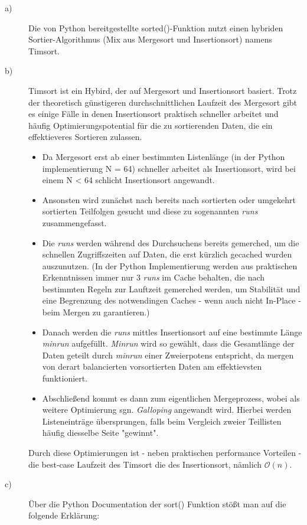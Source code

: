 \begin{description}
\item[a)] Die von Python bereitgestellte sorted()-Funktion nutzt einen hybriden Sortier-Algorithmus (Mix aus Mergesort und Insertionsort) namens Timsort.
\item[b)]
Timsort ist ein Hybird, der auf Mergesort und Insertionsort basiert. Trotz der theoretisch günstigeren durchschnittlichen Laufzeit des Mergesort gibt es einige Fälle in denen Insertionsort praktisch schneller arbeitet und häufig Optimierungspotential für die zu sortierenden Daten, die ein effektieveres Sortieren zulassen.
\begin{itemize}
\item Da Mergesort erst ab einer bestimmten Listenlänge (in der Python implementierung N = 64) schneller arbeitet als Insertionsort, wird bei einem N < 64 schlicht Insertionsort angewandt.
\item Ansonsten wird zunächst nach bereits nach sortierten oder umgekehrt sortierten Teilfolgen gesucht und diese zu sogenannten \textit{runs} zusammengefasst.
\item Die \textit{runs} werden während des Durchsuchens bereits gemerched, um die schnellen Zugriffszeiten auf Daten, die erst kürzlich gecached wurden auszunutzen. (In der Python Implementierung werden aus praktischen Erkenntnissen immer nur 3 \textit{runs} im Cache behalten, die nach bestimmten Regeln zur Lauftzeit gemerched werden, um Stabilität und eine Begrenzung des notwendingen Caches - wenn auch nicht In-Place - beim Mergen zu garantieren.)
\item Danach werden die \textit{runs} mittles Insertionsort auf eine bestimmte Länge \textit{minrun} aufgefüllt. \textit{Minrun} wird so gewählt, dass die Gesamtlänge der Daten geteilt durch \textit{minrun} einer Zweierpotens entspricht, da mergen von derart balancierten vorsortierten Daten am effektievsten funktioniert.
\item Abschließend kommt es dann zum eigentlichen Mergeprozess, wobei als weitere Optimierung sgn. \textit{Galloping} angewandt wird. Hierbei werden Listeneinträge übersprungen, falls beim Vergleich zweier Teillisten häufig diesselbe Seite "gewinnt".
\end{itemize}
Durch diese Optimierungen ist - neben praktischen performance Vorteilen - die best-case Laufzeit des Timsort die des Insertionsort, nämlich ${\mathcal O (n)}$. 
\item[c)]
Über die Python Documentation der sort() Funktion stößt man auf die folgende Erklärung:

\end{description}
